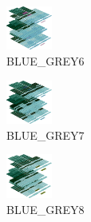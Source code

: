 \hspace{0.1cm}
\begin{minipage}[b]{0.15\linewidth}
\begin{figure}[H]                                                          
  \centering                                                             
  \begin{adjustbox}{width=1.5cm,center}                                   
  \includegraphics[width=1.5cm]{src/colorspace_colourflow/flows/colourflow_172-45.png}%
  \end{adjustbox}                                                        
\caption*{BLUE\_GREY6}                                           
\end{figure}                                                               
\end{minipage}
\hspace{0.1cm}
\begin{minipage}[b]{0.15\linewidth}
\begin{figure}[H]                                                          
  \centering                                                             
  \begin{adjustbox}{width=1.5cm,center}                                   
  \includegraphics[width=1.5cm]{src/colorspace_colourflow/flows/colourflow_173-45.png}%
  \end{adjustbox}                                                        
\caption*{BLUE\_GREY7}                                           
\end{figure}                                                               
\end{minipage}
\hspace{0.1cm}
\begin{minipage}[b]{0.15\linewidth}
\begin{figure}[H]                                                          
  \centering                                                             
  \begin{adjustbox}{width=1.5cm,center}                                   
  \includegraphics[width=1.5cm]{src/colorspace_colourflow/flows/colourflow_174-45.png}%
  \end{adjustbox}                                                        
\caption*{BLUE\_GREY8}                                           
\end{figure}                                                               
\end{minipage}
